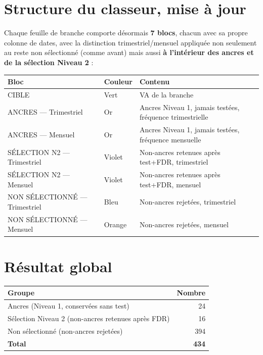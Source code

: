 \documentclass[11pt,a4paper]{article}
\begin{document}
\section{Structure du classeur, mise à jour}

Chaque feuille de branche comporte désormais \textbf{7 blocs}, chacun avec sa propre colonne de dates, avec la distinction trimestriel/mensuel appliquée non seulement au reste non sélectionné (comme avant) mais aussi \textbf{à l'intérieur des ancres et de la sélection Niveau 2} :

\begin{center}
\small
\begin{tabular}{lll}
\toprule
\textbf{Bloc} & \textbf{Couleur} & \textbf{Contenu} \\
\midrule
CIBLE & Vert & VA de la branche \\
ANCRES --- Trimestriel & Or & Ancres Niveau 1, jamais testées, fréquence trimestrielle \\
ANCRES --- Mensuel & Or & Ancres Niveau 1, jamais testées, fréquence mensuelle \\
SÉLECTION N2 --- Trimestriel & Violet & Non-ancres retenues après test+FDR, trimestriel \\
SÉLECTION N2 --- Mensuel & Violet & Non-ancres retenues après test+FDR, mensuel \\
NON SÉLECTIONNÉ --- Trimestriel & Bleu & Non-ancres rejetées, trimestriel \\
NON SÉLECTIONNÉ --- Mensuel & Orange & Non-ancres rejetées, mensuel \\
\bottomrule
\end{tabular}
\end{center}

\section{Résultat global}

\begin{fichebox}
\begin{center}
\begin{tabular}{lr}
\toprule
\textbf{Groupe} & \textbf{Nombre} \\
\midrule
Ancres (Niveau 1, conservées sans test) & 24 \\
Sélection Niveau 2 (non-ancres retenues après FDR) & 16 \\
Non sélectionné (non-ancres rejetées) & 394 \\
\midrule
\textbf{Total} & \textbf{434} \\
\bottomrule
\end{tabular}
\end{center}
\end{fichebox}
\end{document}
